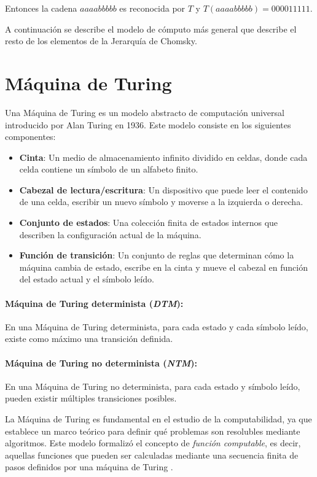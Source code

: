 Entonces la cadena $aaaabbbbb$ es reconocida por $T$ y $T(aaaabbbbb)=000011111$.

A continuación se describe el modelo de cómputo más general que describe el resto de los elementos de la Jerarquía de Chomsky.

\section{Máquina de Turing}

Una Máquina de Turing \cite{authomataTheory} es un modelo abstracto de computación universal introducido por Alan Turing en 1936. Este modelo consiste en los siguientes componentes:

\begin{itemize}
      \item \textbf{Cinta}: Un medio de almacenamiento infinito dividido en celdas, donde cada celda contiene un símbolo de un alfabeto finito.
      \item \textbf{Cabezal de lectura/escritura}: Un dispositivo que puede leer el contenido de una celda, escribir un nuevo símbolo y moverse a la izquierda o derecha.
      \item \textbf{Conjunto de estados}: Una colección finita de estados internos que describen la configuración actual de la máquina.
      \item \textbf{Función de transición}: Un conjunto de reglas que determinan cómo la máquina cambia de estado, escribe en la cinta y mueve el cabezal en función del estado actual y el símbolo leído.
\end{itemize}

\paragraph{Máquina de Turing determinista (\textit{DTM}):}
En una Máquina de Turing determinista, para cada estado y cada símbolo leído, existe como máximo una transición
definida.
\paragraph{Máquina de Turing no determinista (\textit{NTM}):}
En una Máquina de Turing no determinista, para cada estado y símbolo leído, pueden existir múltiples
transiciones posibles.

La Máquina de Turing es fundamental en el estudio de la computabilidad, ya que establece un marco teórico 
para definir qué problemas son resolubles mediante algoritmos. Este modelo formalizó el concepto de 
\textit{función computable}, es decir, aquellas funciones que pueden ser calculadas mediante una secuencia 
finita de pasos definidos por una máquina de Turing \cite{authomataTheory}.

